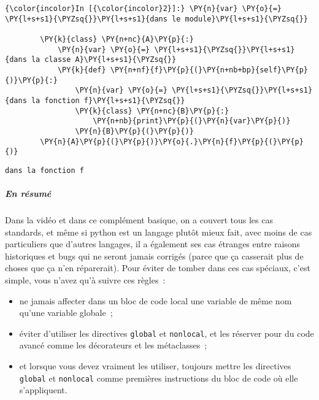     \begin{Verbatim}[commandchars=\\\{\}]
{\color{incolor}In [{\color{incolor}2}]:} \PY{n}{var} \PY{o}{=} \PY{l+s+s1}{\PYZsq{}}\PY{l+s+s1}{dans le module}\PY{l+s+s1}{\PYZsq{}}
        
        \PY{k}{class} \PY{n+nc}{A}\PY{p}{:}
            \PY{n}{var} \PY{o}{=} \PY{l+s+s1}{\PYZsq{}}\PY{l+s+s1}{dans la classe A}\PY{l+s+s1}{\PYZsq{}}
            \PY{k}{def} \PY{n+nf}{f}\PY{p}{(}\PY{n+nb+bp}{self}\PY{p}{)}\PY{p}{:}
                \PY{n}{var} \PY{o}{=} \PY{l+s+s1}{\PYZsq{}}\PY{l+s+s1}{dans la fonction f}\PY{l+s+s1}{\PYZsq{}}
                \PY{k}{class} \PY{n+nc}{B}\PY{p}{:}
                    \PY{n+nb}{print}\PY{p}{(}\PY{n}{var}\PY{p}{)}
                \PY{n}{B}\PY{p}{(}\PY{p}{)}
        \PY{n}{A}\PY{p}{(}\PY{p}{)}\PY{o}{.}\PY{n}{f}\PY{p}{(}\PY{p}{)}
\end{Verbatim}


    \begin{Verbatim}[commandchars=\\\{\}]
dans la fonction f

    \end{Verbatim}

    \hypertarget{en-ruxe9sumuxe9}{%
\subparagraph{En résumé}\label{en-ruxe9sumuxe9}}

    Dans la vidéo et dans ce complément basique, on a couvert tous les cas
standards, et même si python est un langage plutôt mieux fait, avec
moins de cas particuliers que d'autres langages, il a également ses cas
étranges entre raisons historiques et bugs qui ne seront jamais corrigés
(parce que ça casserait plus de choses que ça n'en réparerait). Pour
éviter de tomber dans ces cas spéciaux, c'est simple, vous n'avez qu'à
suivre ces règles~:

\begin{itemize}
\tightlist
\item
  ne jamais affecter dans un bloc de code local une variable de même nom
  qu'une variable globale~;
\item
  éviter d'utiliser les directives \texttt{global} et \texttt{nonlocal},
  et les réserver pour du code avancé comme les décorateurs et les
  métaclasses~;
\item
  et lorsque vous devez vraiment les utiliser, toujours mettre les
  directives \texttt{global} et \texttt{nonlocal} comme premières
  instructions du bloc de code où elle s'appliquent.
\end{itemize}

